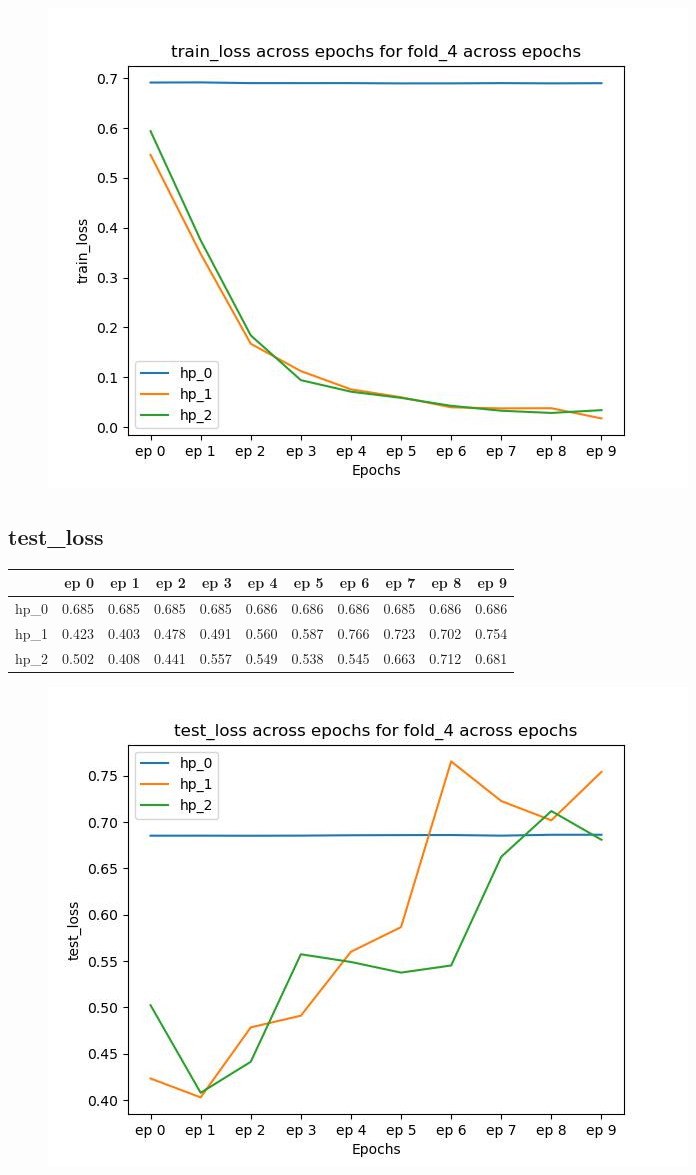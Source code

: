 \documentclass{article}
\begin{document}
\begin{figure}[H]
\includegraphics[scale = 0.75]{fold_4/train_loss}
\end{figure}
\subsection{test\_loss}
\begin{tabular}{lrrrrrrrrrr}
\toprule
{} &   ep 0 &   ep 1 &   ep 2 &   ep 3 &   ep 4 &   ep 5 &   ep 6 &   ep 7 &   ep 8 &   ep 9 \\
\midrule
hp\_0 &  0.685 &  0.685 &  0.685 &  0.685 &  0.686 &  0.686 &  0.686 &  0.685 &  0.686 &  0.686 \\
hp\_1 &  0.423 &  0.403 &  0.478 &  0.491 &  0.560 &  0.587 &  0.766 &  0.723 &  0.702 &  0.754 \\
hp\_2 &  0.502 &  0.408 &  0.441 &  0.557 &  0.549 &  0.538 &  0.545 &  0.663 &  0.712 &  0.681 \\
\bottomrule
\end{tabular}

\begin{figure}[H]
\includegraphics[scale = 0.75]{fold_4/test_loss}
\end{figure}
\end{document}
